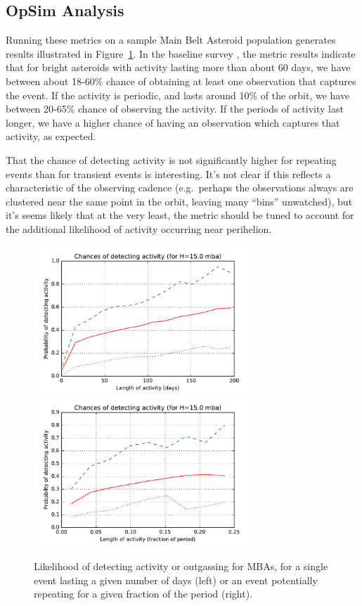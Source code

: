 
\subsection{OpSim Analysis}
\label{sec:\secname:analysis}

Running these metrics on a sample Main Belt Asteroid population
generates results illustrated in Figure~\ref{activity}.
In the baseline survey , the metric results
indicate that for bright asteroids with activity lasting more than
about 60 days, we have between about 18-60\% chance of obtaining at
least one observation that captures the event. If the activity is
periodic, and lasts around 10\% of the orbit, we have between
20-65\% chance of observing the activity. If the periods of activity
last longer, we have a higher chance of having an observation which
captures that activity, as expected.

That the chance of detecting activity is not significantly higher for
repeating events than for transient events is interesting. It's not
clear if this reflects a characteristic of the observing cadence
(e.g.\ perhaps the observations always are clustered near the same
point in the orbit, leaving many ``bins'' unwatched), but it's seems
likely that at  the very least, the metric should be tuned to account for the additional
likelihood of activity occurring near perihelion.

\begin{figure}
\includegraphics[width=3.3in]{figs/solarsystem/minion_1016_mba_Activity_time.pdf}
\includegraphics[width=3.3in]{figs/solarsystem/minion_1016_mba_Activity_period.pdf}
\caption{Likelihood of detecting activity or outgassing for MBAs, for
  a single event lasting a given number of days (left) or an event
  potentially repeating for a given fraction of the period (right).
\label{activity}}
\end{figure}


